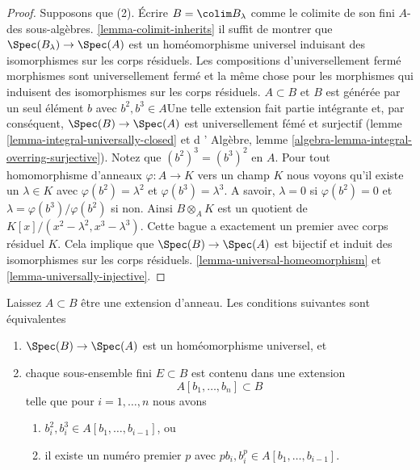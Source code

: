 \begin{proof}
Supposons que (2). Écrire $B = \colim B_\lambda$ comme le colimite de son fini $A$- des sous-algèbres. \ref{lemma-colimit-inherits} il suffit de montrer que $\Spec(B_\lambda) \to \Spec(A)$ est un homéomorphisme universel induisant des isomorphismes sur les corps résiduels. Les compositions d'universellement fermé morphismes sont universellement fermé et la même chose pour les morphismes qui induisent des isomorphismes sur les corps résiduels. $A \subset B$ et $B$ est générée par un seul élément $b$ avec $b^2, b^3 \in A$Une telle extension fait partie intégrante et, par conséquent, $\Spec(B) \to \Spec(A)$ est universellement fémé et surjectif (lemme \ref{lemma-integral-universally-closed} et d ' Algèbre, lemme \ref{algebra-lemma-integral-overring-surjective}). Notez que $(b^2)^3 = (b^3)^2$ en $A$. Pour tout homomorphisme d'anneaux $\varphi : A \to K$ vers un champ $K$ nous voyons qu'il existe un $\lambda \in K$ avec $\varphi(b^2) = \lambda^2$ et
$\varphi(b^3) = \lambda^3$. A savoir, $\lambda = 0$ si $\varphi(b^2) = 0$
et $\lambda = \varphi(b^3)/\varphi(b^2)$ si non. Ainsi
$B \otimes_A K$ est un quotient de $K[x]/(x^2 - \lambda^2, x^3 - \lambda^3)$. Cette bague a exactement un premier avec corps résiduel $K$. Cela implique que $\Spec(B) \to \Spec(A)$ est bijectif et induit des isomorphismes sur les corps résiduels. \ref{lemma-universal-homeomorphism}
et \ref{lemma-universally-injective}.

\end{proof}

\begin{proposition}

\label{proposition-universal-homeomorphism}
Laissez $A \subset B$ être une extension d'anneau. Les conditions suivantes sont équivalentes
\begin{enumerate}
\item $\Spec(B) \to \Spec(A)$ est un homéomorphisme universel, et
\item chaque sous-ensemble fini $E \subset B$ est contenu dans une extension $$
A[b_1, \ldots, b_n] \subset B
$$ telle que pour $i = 1, \ldots, n$ nous avons
\begin{enumerate}
\item $b_i^2, b_i^3 \in A[b_1, \ldots, b_{i - 1}]$, ou
\item il existe un numéro premier $p$ avec $pb_i, b_i^p \in A[b_1, \ldots, b_{i - 1}]$.
\end{enumerate}

\end{enumerate}

\end{proposition}


